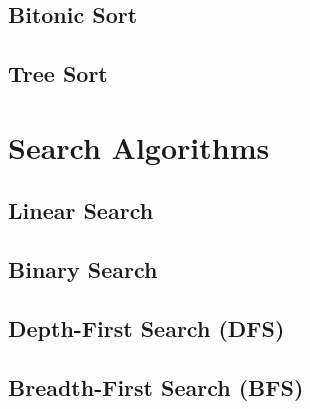 \documentclass[11pt]{article}
\begin{document}
        \subsection{Bitonic Sort}

        \subsection{Tree Sort}




\section{Search Algorithms}


        \subsection{Linear Search}
        \subsection{Binary Search}
        \subsection{Depth-First Search (DFS)}
        \subsection{Breadth-First Search (BFS)}


        \subsection{}
        \subsection{}
        \subsection{}
        \subsection{}
        \subsection{}
        \subsection{}
        \subsection{}
        \subsection{}
\end{document}

